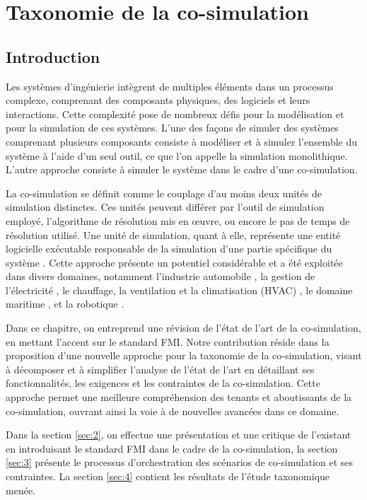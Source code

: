 \chapter{Taxonomie de la co-simulation}\label{sec:tax}
\section*{Introduction}
Les systèmes d'ingénierie intègrent de multiples éléments dans un processus complexe, comprenant des composants physiques, des logiciels et leurs interactions. Cette complexité pose de nombreux défis pour la modélisation et pour la simulation de ces systèmes. L'une des façons de simuler des systèmes comprenant plusieurs composants consiste à modéliser et à simuler l'ensemble du système à l'aide d'un seul outil, ce que l'on appelle la simulation monolithique. L'autre approche consiste à simuler le système dans le cadre d'une co-simulation. 

La co-simulation se définit comme le couplage d'au moins deux unités de simulation distinctes. Ces unités peuvent différer par l'outil de simulation employé, l'algorithme de résolution mis en œuvre, ou encore le pas de temps de résolution utilisé. Une unité de simulation, quant à elle, représente une entité logicielle exécutable responsable de la simulation d'une partie spécifique du système \cite{1,2}. Cette approche présente un potentiel considérable et a été exploitée dans divers domaines, notamment l'industrie automobile \cite{b1}, la gestion de l'électricité \cite{b2}, le chauffage, la ventilation et la climatisation (HVAC) \cite{b3}, le domaine maritime \cite{b4}, et la robotique \cite{b5}.

Dans ce chapitre, on entreprend une révision de l'état de l'art de la co-simulation, en mettant l'accent sur le standard FMI. Notre contribution réside dans la proposition d'une nouvelle approche pour la taxonomie de la co-simulation, visant à décomposer et à simplifier l'analyse de l'état de l'art en détaillant ses fonctionnalités, les exigences et les contraintes de la co-simulation. Cette approche permet une meilleure compréhension des tenants et aboutissants de la co-simulation, ouvrant ainsi la voie à de nouvelles avancées dans ce domaine.

Dans la section \ref{sec:2}, on effectue une présentation et une critique de l'existant en introduisant le standard FMI dans le cadre de la co-simulation, la section \ref{sec:3} présente le processus d'orchestration des scénarios de co-simulation et ses contraintes. La section \ref{sec:4} contient les résultats de l'étude taxonomique menée.


